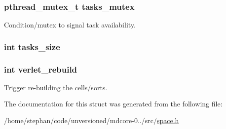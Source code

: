 \hypertarget{structspace_a733e78f89bc6e3cd82d2248ae5c38992}{
\subsubsection[{tasks\-\_\-mutex}]{\setlength{\rightskip}{0pt plus 5cm}pthread\-\_\-mutex\-\_\-t tasks\-\_\-mutex}}\label{structspace_a733e78f89bc6e3cd82d2248ae5c38992}
Condition/mutex to signal task availability. \hypertarget{structspace_a51ba14384309b40c30d6a908b8caab5d}{
\subsubsection[{tasks\-\_\-size}]{\setlength{\rightskip}{0pt plus 5cm}int tasks\-\_\-size}}\label{structspace_a51ba14384309b40c30d6a908b8caab5d}
\hypertarget{structspace_a767fceff621253e5a779078970a5973b}{
\subsubsection[{verlet\-\_\-rebuild}]{\setlength{\rightskip}{0pt plus 5cm}int verlet\-\_\-rebuild}}\label{structspace_a767fceff621253e5a779078970a5973b}
Trigger re-\/building the cells/sorts. 

The documentation for this struct was generated from the following file\-:\begin{DoxyCompactItemize}
\item 
/home/stephan/code/unversioned/mdcore-\/0../src/\hyperlink{space_8h}{space.\-h}\end{DoxyCompactItemize}
